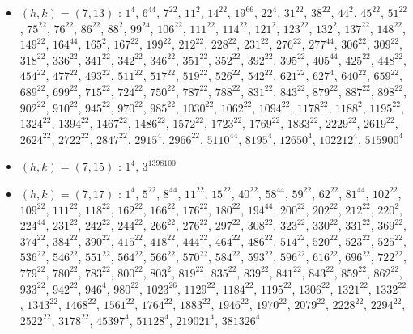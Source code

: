 \begin{itemize}
\item $(h,k)=(7,13)$ : $1^{4}$, $6^{44}$, $7^{22}$, $11^{2}$, $14^{22}$, $19^{66}$, $22^{4}$, $31^{22}$, $38^{22}$, $44^{2}$, $45^{22}$, $51^{22}$, $75^{22}$, $76^{22}$, $86^{22}$, $88^{2}$, $99^{24}$, $106^{22}$, $111^{22}$, $114^{22}$, $121^{2}$, $123^{22}$, $132^{2}$, $137^{22}$, $148^{22}$, $149^{22}$, $164^{44}$, $165^{2}$, $167^{22}$, $199^{22}$, $212^{22}$, $228^{22}$, $231^{22}$, $276^{22}$, $277^{44}$, $306^{22}$, $309^{22}$, $318^{22}$, $336^{22}$, $341^{22}$, $342^{22}$, $346^{22}$, $351^{22}$, $352^{22}$, $392^{22}$, $395^{22}$, $405^{44}$, $425^{22}$, $448^{22}$, $454^{22}$, $477^{22}$, $493^{22}$, $511^{22}$, $517^{22}$, $519^{22}$, $526^{22}$, $542^{22}$, $621^{22}$, $627^{4}$, $640^{22}$, $659^{22}$, $689^{22}$, $699^{22}$, $715^{22}$, $724^{22}$, $750^{22}$, $787^{22}$, $788^{22}$, $831^{22}$, $843^{22}$, $879^{22}$, $887^{22}$, $898^{22}$, $902^{22}$, $910^{22}$, $945^{22}$, $970^{22}$, $985^{22}$, $1030^{22}$, $1062^{22}$, $1094^{22}$, $1178^{22}$, $1188^{2}$, $1195^{22}$, $1324^{22}$, $1394^{22}$, $1467^{22}$, $1486^{22}$, $1572^{22}$, $1723^{22}$, $1769^{22}$, $1833^{22}$, $2229^{22}$, $2619^{22}$, $2624^{22}$, $2722^{22}$, $2847^{22}$, $2915^{4}$, $2966^{22}$, $5110^{44}$, $8195^{4}$, $12650^{4}$, $102212^{4}$, $515900^{4}$
\item $(h,k)=(7,15)$ : $1^{4}$, $3^{1398100}$
\item $(h,k)=(7,17)$ : $1^{4}$, $5^{22}$, $8^{44}$, $11^{22}$, $15^{22}$, $40^{22}$, $58^{44}$, $59^{22}$, $62^{22}$, $81^{44}$, $102^{22}$, $109^{22}$, $111^{22}$, $118^{22}$, $162^{22}$, $166^{22}$, $176^{22}$, $180^{22}$, $194^{44}$, $200^{22}$, $202^{22}$, $212^{22}$, $220^{2}$, $224^{44}$, $231^{22}$, $242^{22}$, $244^{22}$, $266^{22}$, $276^{22}$, $297^{22}$, $308^{22}$, $323^{22}$, $330^{22}$, $331^{22}$, $369^{22}$, $374^{22}$, $384^{22}$, $390^{22}$, $415^{22}$, $418^{22}$, $444^{22}$, $464^{22}$, $486^{22}$, $514^{22}$, $520^{22}$, $523^{22}$, $525^{22}$, $536^{22}$, $546^{22}$, $551^{22}$, $564^{22}$, $566^{22}$, $570^{22}$, $584^{22}$, $593^{22}$, $596^{22}$, $616^{22}$, $696^{22}$, $722^{22}$, $779^{22}$, $780^{22}$, $783^{22}$, $800^{22}$, $803^{2}$, $819^{22}$, $835^{22}$, $839^{22}$, $841^{22}$, $843^{22}$, $859^{22}$, $862^{22}$, $933^{22}$, $942^{22}$, $946^{4}$, $980^{22}$, $1023^{26}$, $1129^{22}$, $1184^{22}$, $1195^{22}$, $1306^{22}$, $1321^{22}$, $1332^{22}$, $1343^{22}$, $1468^{22}$, $1561^{22}$, $1764^{22}$, $1883^{22}$, $1946^{22}$, $1970^{22}$, $2079^{22}$, $2228^{22}$, $2294^{22}$, $2522^{22}$, $3178^{22}$, $45397^{4}$, $51128^{4}$, $219021^{4}$, $381326^{4}$

\end{itemize}
